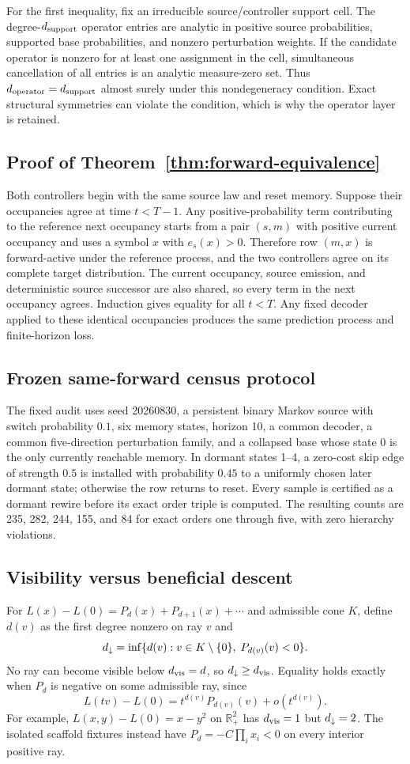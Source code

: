 For the first inequality, fix an irreducible source/controller support cell. The degree-$d_{\mathrm{support}}$ operator entries are analytic in positive source probabilities, supported base probabilities, and nonzero perturbation weights. If the candidate operator is nonzero for at least one assignment in the cell, simultaneous cancellation of all entries is an analytic measure-zero set. Thus $d_{\mathrm{operator}}=d_{\mathrm{support}}$ almost surely under this nondegeneracy condition. Exact structural symmetries can violate the condition, which is why the operator layer is retained.

\subsection{Proof of Theorem~\ref{thm:forward-equivalence}}
Both controllers begin with the same source law and reset memory. Suppose their occupancies agree at time $t<T-1$. Any positive-probability term contributing to the reference next occupancy starts from a pair $(s,m)$ with positive current occupancy and uses a symbol $x$ with $e_s(x)>0$. Therefore row $(m,x)$ is forward-active under the reference process, and the two controllers agree on its complete target distribution. The current occupancy, source emission, and deterministic source successor are also shared, so every term in the next occupancy agrees. Induction gives equality for all $t<T$. Any fixed decoder applied to these identical occupancies produces the same prediction process and finite-horizon loss.

\subsection{Frozen same-forward census protocol}
The fixed audit uses seed 20260830, a persistent binary Markov source with switch probability $0.1$, six memory states, horizon 10, a common decoder, a common five-direction perturbation family, and a collapsed base whose state 0 is the only currently reachable memory. In dormant states 1--4, a zero-cost skip edge of strength $0.5$ is installed with probability $0.45$ to a uniformly chosen later dormant state; otherwise the row returns to reset. Every sample is certified as a dormant rewire before its exact order triple is computed. The resulting counts are 235, 282, 244, 155, and 84 for exact orders one through five, with zero hierarchy violations.

\subsection{Visibility versus beneficial descent}
For $L(x)-L(0)=P_d(x)+P_{d+1}(x)+\cdots$ and admissible cone $K$, define $d(v)$ as the first degree nonzero on ray $v$ and
\[
d_{\downarrow}=\inf\{d(v):v\in K\setminus\{0\},\;P_{d(v)}(v)<0\}.
\]
No ray can become visible below $d_{\mathrm{vis}}=d$, so $d_{\downarrow}\geq d_{\mathrm{vis}}$. Equality holds exactly when $P_d$ is negative on some admissible ray, since
\[
L(tv)-L(0)=t^{d(v)}P_{d(v)}(v)+o(t^{d(v)}).
\]
For example, $L(x,y)-L(0)=x-y^2$ on $\mathbb R_+^2$ has $d_{\mathrm{vis}}=1$ but $d_{\downarrow}=2$. The isolated scaffold fixtures instead have $P_d=-C\prod_i x_i<0$ on every interior positive ray.

